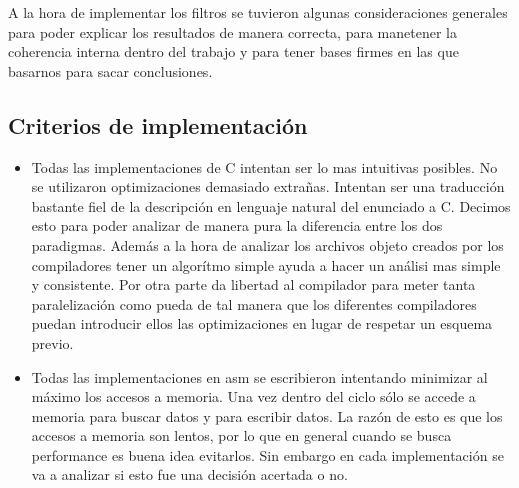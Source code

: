 
	A la hora de implementar los filtros se tuvieron algunas consideraciones generales 
para poder explicar los resultados de manera correcta, para manetener la coherencia
interna dentro del trabajo y para tener bases firmes en las que basarnos para sacar
conclusiones.

\subsection{Criterios de implementación}

\begin{itemize}
			\item Todas las implementaciones de C intentan ser lo mas intuitivas posibles. No se
			utilizaron optimizaciones demasiado extrañas. Intentan ser una traducción bastante
			fiel de la descripción en lenguaje natural del enunciado a C. Decimos esto para
			poder analizar de manera pura la diferencia entre los dos paradigmas. Además
			a la hora de analizar los archivos objeto creados por los compiladores
			tener un algorítmo simple ayuda a hacer un análisi mas simple y consistente.
			Por otra parte da libertad al compilador para meter tanta paralelización como pueda
			de tal manera que los diferentes compiladores puedan introducir ellos las optimizaciones
			en lugar de respetar un esquema previo.

			\item Todas las implementaciones en asm se escribieron intentando minimizar al máximo
			los accesos a memoria. Una vez dentro del ciclo sólo se accede a memoria para buscar
			datos y para escribir datos. La razón de esto es que los accesos a memoria son lentos,
			por lo que en general cuando se busca performance es buena idea evitarlos. Sin embargo
			en cada implementación se va a analizar si esto fue una decisión acertada o no.
\end{itemize}		

